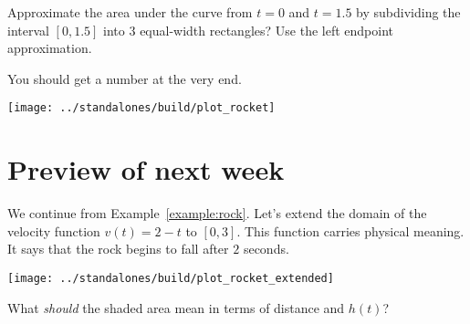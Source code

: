 \documentclass[../main.tex]{subfiles}
\begin{document}
\clearpage
\begin{example}
  Approximate the area under the curve from \(t=0\) and \(t=1.5\) by subdividing the interval \([0,1.5]\) into \(3\) equal-width rectangles? Use the left endpoint approximation.

  You should get a number at the very end. 
\end{example}
\texttt{[image: ../standalones/build/plot\_rocket]}
\clearpage

\section{Preview of next week}
\begin{example}
  We continue from Example~\ref{example:rock}. Let's extend the domain of the velocity function \(v(t) = 2 - t\) to \([0,3]\). This function carries physical meaning. It says that the rock begins to fall after \(2\) seconds.

  \texttt{[image: ../standalones/build/plot\_rocket\_extended]}

  \faComments{} What \emph{should} the shaded area mean in terms of distance and \(h(t)\)?
\end{example}
\end{document}
